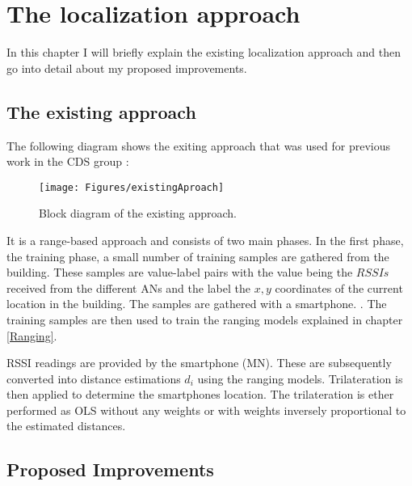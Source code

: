 \chapter{The localization approach} %

\label{Chapter3} %

In this chapter I will briefly explain the existing localization approach and then go into detail about my proposed improvements.

\section{The existing approach}

The following diagram shows the exiting approach that was used for previous work in the CDS group \cite{josePaper}:

\begin{figure}[ht]
\centering
\texttt{[image: Figures/existingAproach]}
\decoRule
\caption[The existing approach]{Block diagram of the existing approach.}
\label{fig:existingApproach}
\end{figure}

It is a range-based approach and consists of two main phases. In the first phase, the training phase, a small number of training samples are gathered from the building. These samples are value-label pairs with the value being the \(RSSIs\) received from the different ANs and the label the \(x,y\) coordinates of the current location in the building. The samples are gathered with a smartphone. . The training samples are then used to train the ranging models explained in chapter \ref{Ranging}.

 RSSI readings are provided by the smartphone (MN). These are subsequently converted into distance estimations \(d_i\)  using the ranging models. Trilateration is then applied to determine the smartphones location. The trilateration is ether performed as OLS without any weights or with weights inversely proportional to the estimated distances.

\section{Proposed Improvements}


